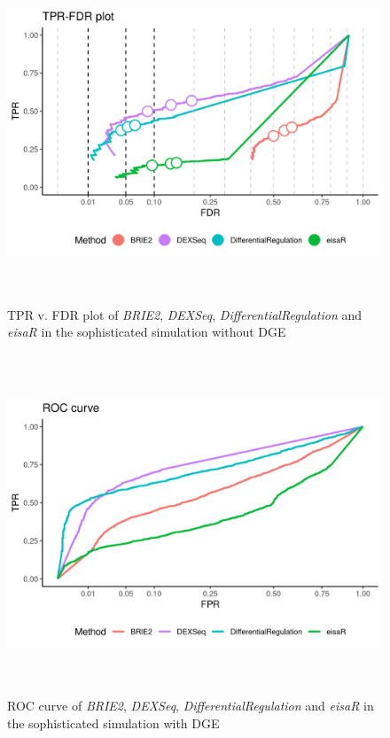 \begin{figure}[!htb]
\begin{center}
\includegraphics[width=6in,height=4in]{../figures/simulation/minnow_simulation_FDR.png}
\end{center}
\caption{TPR v. FDR plot of \emph{BRIE2}, \emph{DEXSeq}, \emph{DifferentialRegulation} and \emph{eisaR} in the sophisticated simulation without DGE}
\label{fig:soph_sim_FDR}
\end{figure}

\begin{figure}[!htb]
\begin{center}
\includegraphics[width=6in,height=4in]{../figures/simulation/minnow_simulation_DGE_ROC.png}
\end{center}
\caption{ROC curve of \emph{BRIE2}, \emph{DEXSeq}, \emph{DifferentialRegulation} and \emph{eisaR} in the sophisticated simulation with DGE}
\label{fig:soph_sim_DGE_ROC}
\end{figure}

